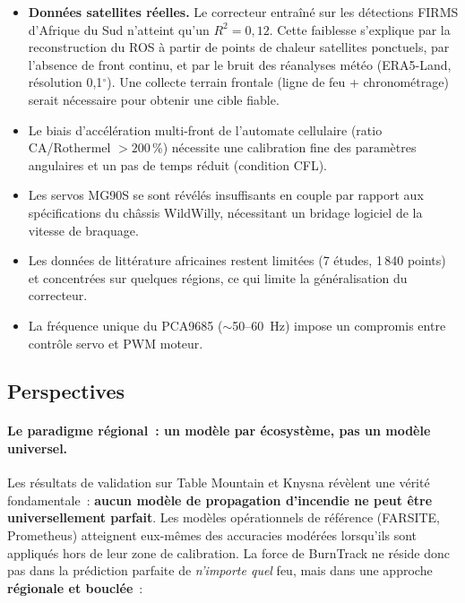 \begin{itemize}[nosep]
    \item \textbf{Données satellites réelles.} Le correcteur entraîné sur les détections FIRMS d'Afrique du Sud n'atteint qu'un $R^2 = 0{,}12$. Cette faiblesse s'explique par la reconstruction du ROS à partir de points de chaleur satellites ponctuels, par l'absence de front continu, et par le bruit des réanalyses météo (ERA5-Land, résolution 0,1$^\circ$). Une collecte terrain frontale (ligne de feu + chronométrage) serait nécessaire pour obtenir une cible fiable.
    \item Le biais d'accélération multi-front de l'automate cellulaire (ratio CA/Rothermel $> 200$\,\%) nécessite une calibration fine des paramètres angulaires et un pas de temps réduit (condition CFL).
    \item Les servos MG90S se sont révélés insuffisants en couple par rapport aux spécifications du châssis WildWilly, nécessitant un bridage logiciel de la vitesse de braquage.
    \item Les données de littérature africaines restent limitées (7 études, 1\,840 points) et concentrées sur quelques régions, ce qui limite la généralisation du correcteur.
    \item La fréquence unique du PCA9685 ($\sim$50--60~Hz) impose un compromis entre contrôle servo et PWM moteur.
\end{itemize}

\subsection*{Perspectives}

\paragraph{Le paradigme régional~: un modèle par écosystème, pas un modèle universel.}
Les résultats de validation sur Table Mountain et Knysna révèlent une vérité fondamentale~: \textbf{aucun modèle de propagation d'incendie ne peut être universellement parfait}. Les modèles opérationnels de référence (FARSITE, Prometheus) atteignent eux-mêmes des accuracies modérées lorsqu'ils sont appliqués hors de leur zone de calibration. La force de BurnTrack ne réside donc pas dans la prédiction parfaite de \textit{n'importe quel} feu, mais dans une approche \textbf{régionale et bouclée}~:

